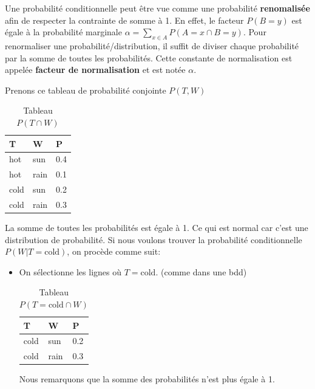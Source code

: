 Une probabilité conditionnelle peut être vue comme une probabilité \textbf{renomalisée} afin de 
respecter la contrainte de somme à 1. En effet, le facteur $P(B=y)$ est égale à la probabilité marginale 
$\alpha = \sum_{x \in A} P(A=x\cap B=y)$.
Pour renormaliser une probabilité/distribution, il suffit de diviser chaque probabilité par la somme de toutes les probabilités.
Cette constante de normalisation est appelée \textbf{facteur de normalisation} et est notée $\alpha$.
\newpage
\begin{example}\leavevmode
    Prenons ce tableau de probabilité conjointe $P(T, W)$
    \begin{table}[H]
        \centering
        \begin{tabular}{|ll|l|}
            \hline
            \multicolumn{1}{|l|}{T} & W    & P   \\ \hline
            hot                     & sun  & 0.4 \\
            hot                     & rain & 0.1 \\
            cold                    & sun  & 0.2 \\
            cold                    & rain & 0.3 \\ \hline
        \end{tabular}
        \caption{Tableau $P(T \cap W)$}\label{fig:tableau}
    \end{table}
    La somme de toutes les probabilités est égale à 1. Ce qui est normal car c'est une distribution de probabilité.
    Si nous voulons trouver la probabilité conditionnelle $P(W | T=\text{cold})$, on procède comme suit: 
    \begin{itemize}
        \item On sélectionne les lignes où $T=\text{cold}$. (comme dans une bdd)
            \begin{table}[H]
                \centering
                \begin{tabular}{|ll|l|}
                    \hline
                    \multicolumn{1}{|l|}{T} & W    & P   \\ \hline
                    cold                    & sun  & 0.2 \\
                    cold                    & rain & 0.3 \\ \hline
                \end{tabular}
                \caption{Tableau $P(T=\text{cold} \cap W)$}\label{fig:tableaucold}
            \end{table}
            Nous remarquons que la somme des probabilités n'est plus égale à 1.

\end{itemize}
\end{example}

